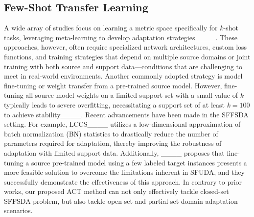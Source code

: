 \subsection{Few-Shot Transfer Learning}

A wide array of studies focus on learning a metric space specifically for $k$-shot tasks, leveraging meta-learning to develop adaptation strategies____. These approaches, however, often require specialized network architectures, custom loss functions, and training strategies that depend on multiple source domains or joint training with both source and support data—conditions that are challenging to meet in real-world environments. Another commonly adopted strategy is model fine-tuning or weight transfer from a pre-trained source model. However, fine-tuning all source model weights on a limited support set with a small value of $k$ typically leads to severe overfitting, necessitating a support set of at least $k = 100$ to achieve stability____. Recent advancements have been made in the SFFSDA setting. For example, LCCS____ utilizes a low-dimensional approximation of batch normalization (BN) statistics to drastically reduce the number of parameters required for adaptation, thereby improving the robustness of adaptation with limited support data. Additionally, ____ proposes that fine-tuning a source pre-trained model using a few labeled target instances presents a more feasible solution to overcome the limitations inherent in SFUDA, and they successfully demonstrate the effectiveness of this approach. In contrary to prior works, our proposed ACT method can not only effectively tackle closed-set SFFSDA problem, but also tackle open-set and partial-set domain adaptation scenarios.